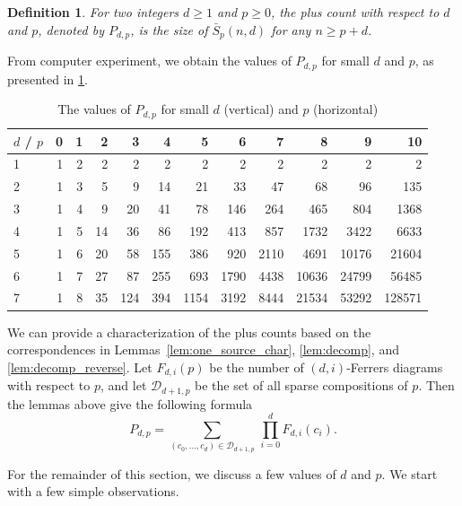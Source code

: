 \documentclass[a4paper,11pt]{amsart}
\newtheorem{definition}[theorem]{Definition}
\newcommand{\D}{\mathcal{D}}
\newcommand{\defi}[1]{\textcolor{defblue}{\emph{#1}}}
\begin{document}
\begin{definition}
    For two integers $d \geq 1$ and $p \geq 0$, the \defi{plus count} with respect to $d$ and $p$, denoted by $P_{d,p}$, is the size of $\bar{S}_p(n,d)$ for any $n \geq p + d$.
\end{definition}


From computer experiment, we obtain the values of $P_{d,p}$ for small $d$ and $p$, as presented in \cref{tab:plus_count}.

\begin{table}
    \centering
    \begin{tabular}{l | r r r r r r r r r r r}
        $d$ / $p$ & 0 & 1 & 2 & 3 & 4 & 5 & 6 & 7 & 8 & 9 & 10 \\
        \hline
        1 & 1 & 2 & 2 & 2 & 2 & 2 & 2 & 2 & 2 & 2 & 2 %
        \\
        2 & 1 & 3 & 5 & 9 & 14 & 21 & 33 & 47 & 68 & 96 & 135 %
        \\
        3 & 1 & 4 & 9 & 20 & 41 & 78 & 146 & 264 & 465 & 804 & 1368 %
        \\
        4 & 1 & 5 & 14 & 36 & 86 & 192 & 413  & 857 & 1732 & 3422 & 6633 \\
        5 & 1 & 6 & 20 & 58 & 155 & 386 & 920 & 2110 & 4691 & 10176 & 21604 \\
        6 & 1 & 7 & 27 & 87 & 255 & 693 & 1790 & 4438 & 10636 & 24799 & 56485\\
        7 & 1 & 8 & 35 & 124 & 394 & 1154 & 3192 & 8444 & 21534 & 53292 & 128571 \\
    \end{tabular}
    \caption{The values of $P_{d,p}$ for small $d$ (vertical) and $p$ (horizontal)}
    \label{tab:plus_count}
\end{table}

We can provide a characterization of the plus counts based on the correspondences in Lemmas~\ref{lem:one_source_char}, \ref{lem:decomp}, and \ref{lem:decomp_reverse}.
Let $F_{d,i}(p)$ be the number of $(d,i)$-Ferrers diagrams with respect to $p$, and let $\D_{d+1,p}$ be the set of all sparse compositions of $p$.
Then the lemmas above give the following formula
\begin{equation}
\label{eq:plus_count}
    P_{d,p} = \sum_{(c_0,\dots,c_d) \in \D_{d+1,p}} \, \prod^d_{i=0} F_{d,i}(c_i).
\end{equation}

For the remainder of this section, we discuss a few values of $d$ and $p$.
We start with a few simple observations.
\end{document}

